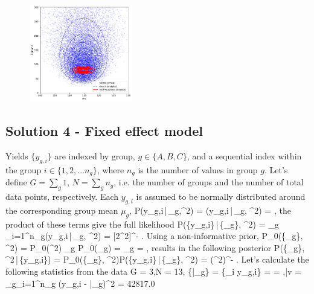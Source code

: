 \documentclass[10pt,oneside]{article}
\begin{document}
\begin{figure}[h]
\centering
	\includegraphics[width=0.40\textwidth]{P3_joint_posterior.pdf}
\end{figure}


\subsection*{Solution 4 - Fixed effect model}
Yields $\{y_{g,i}\}$ are indexed by group, $g\in\{A, B, C\}$, and a sequential index within the group $i \in \{1,2,\ldots n_g\}$, where $n_g$ is the number of values in group $g$. Let's define $G = \sum_g 1$, $N = \sum_g n_g$, i.e. the number of groups and the number of total data points, respectively. Each $y_{g,i}$ is assumed to be normally distributed around the corresponding group mean $\mu_g$,
\be
	P(y_{g,i}\,|\,\mu_g,\sigma^2) = (y_{g,i}\,|\,\mu_g, \sigma^2) = \exp{},
\ee
the product of these terms give the full likelihood
\be
	P(\{y_{g,i}\}\,|\,\{\mu_g\}, \sigma^2) = \prod_g \prod_{i=1}^{n_g}(y_{g,i}\,|\,\mu_g, \sigma^2) = [2\pi\sigma^2]^{-} \exp\left[-\frac{1}{2\sigma^2}\sum_g\sum_{i=1}^{n_g}(y_{g,i} - \mu_g)^2\right].
\ee
Using a non-informative prior,
\be
	P_0(\{\mu_g\}, \sigma^2) = P_0(\sigma^2) \prod_g P_0(\mu_g) =  \prod_g  = ,
\ee
results in the following posterior
\be
	P(\{\mu_g\}, \sigma^2\,|\,\{y_{g,i}\}) =  \times P_0(\{\mu_g\}, \sigma^2)\times P(\{y_{g,i}\}\,|\,\{\mu_g\}, \sigma^2) =  (\sigma^2)^{-} \exp\left[-\frac{1}{2\sigma^2}\sum_g\sum_{i=1}^{n_g}(y_{g,i} - \mu_g)^2\right].
\ee
Let's calculate the following statistics from the data
\be
	G = 3,\qquad N = 13, \qquad \{\bar\mu_g\} = \Big\{\sum_i y_{g,i}\Big\} =  = ,\qquad \bar v =  \sum_g\sum_{i=1}^{n_g} (y_{g,i} - \bar \mu_g)^2 = 42817.0
\ee
\end{document}
